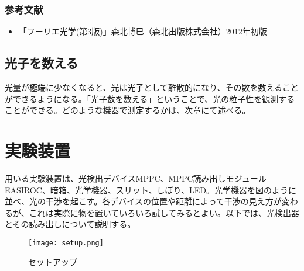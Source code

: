 \documentclass[10pt,a4j]{jarticle}
\begin{document}
\subsubsection{参考文献}
\begin{itemize}
\item 「フーリエ光学(第3版)」森北博巳（森北出版株式会社）2012年初版
\end{itemize}
\clearpage


\subsection{光子を数える}
光量が極端に少なくなると、光は光子として離散的になり、その数を数えることができるようになる。「光子数を数える」ということで、光の粒子性を観測することができる。どのような機器で測定するかは、次章にて述べる。


\section{実験装置}
用いる実験装置は、光検出デバイスMPPC、MPPC読み出しモジュールEASIROC、暗箱、光学機器、スリット、しぼり、LED。光学機器を図のように並べ、光の干渉を起こす。各デバイスの位置や距離によって干渉の見え方が変わるが、これは実際に物を置いていろいろ試してみるとよい。以下では、光検出器とその読み出しについて説明する。
\begin{figure}[h]
\begin{center}
\texttt{[image: setup.png]}
\end{center}
\caption{セットアップ}
\end{figure}
\end{document}
